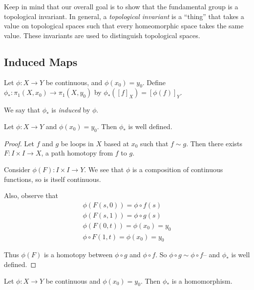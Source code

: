 Keep in mind that our overall goal is to show that the fundamental group is a topological invariant. In general, a \emph{topological invariant} is a ``thing'' that takes a value on topological spaces such that every homeomorphic space takes the same value. These invariants are used to distinguish topological spaces.

\subsection{Induced Maps} 
\begin{definition}
	Let $\phi:X\to Y$ be continuous, and $\phi(x_0)=y_0$. Define $\phi_*: \pi_1(X,x_0)\to \pi_1(X,y_0)$ by $\phi_*([f]_X)=[\phi(f)]_Y.$
	
	We say that $\phi_*$ is \emph{induced} by $\phi$. 
\end{definition}
\begin{smallfact}
	 Let $\phi:X\to Y$ and $\phi(x_0)=y_0$. Then $\phi_*$ is well defined. 
\end{smallfact}
\begin{proof}
	Let $f$ and $g$ be loops in $X$ based at $x_0$ such that $f\sim g$. Then there exists $F:I\times I\to X$, a path homotopy from $f$ to $g$. \vspace{.4in}
	
	Consider $\phi(F): I\times I \to Y$. We see that $\phi$ is a composition of continuous functions, so is itself continuous. 
	
	Also, observe that 
	\begin{align*}
		\phi(F(s,0)) =\phi\circ f(s)\\
		\phi(F(s,1)) =\phi\circ g(s)\\
		\phi(F(0,t)) =\phi(x_0) = y_0\\
		\phi\circ F(1,t) =\phi(x_0)=y_0 
	\end{align*}
	
	Thus $\phi(F)$ is a homotopy between $\phi\circ g$ and $\phi\circ f$. So $\phi\circ g\sim \phi\circ f$-- and $\phi_*$ is well defined. 
\end{proof}
\begin{lemma}
	Let $\phi:X\to Y$ be continuous and $\phi(x_0)=y_0$. Then $\phi_*$ is a homomorphism. 
\end{lemma}
